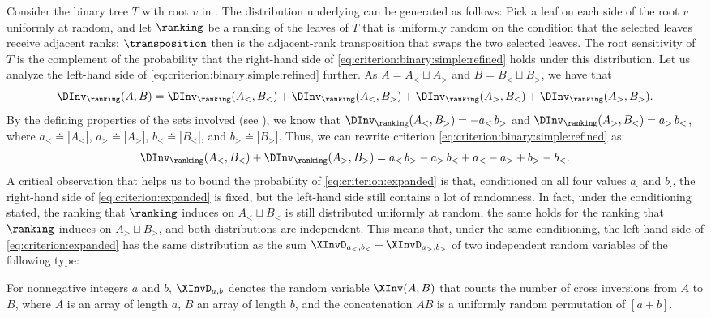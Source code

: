Consider the binary tree $T$ with root $v$ in . The distribution underlying  can be generated as follows: Pick a leaf on each side of the root $v$ uniformly at random, and let $\ranking$ be a ranking of the leaves of $T$ that is uniformly random on the condition that the selected leaves receive adjacent ranks; $\transposition$ then is the adjacent-rank transposition that swaps the two selected leaves. The root sensitivity of $T$ is the complement of the probability that the right-hand side of \eqref{eq:criterion:binary:simple:refined} holds under this distribution. Let us analyze the left-hand side of \eqref{eq:criterion:binary:simple:refined} further. As $A = A_< \sqcup A_>$ and $B = B_< \sqcup B_>$, we have that
\[ \DInv_\ranking(A,B) = \DInv_\ranking(A_<,B_<) + \DInv_\ranking(A_<,B_>) + \DInv_\ranking(A_>,B_<) + \DInv_\ranking(A_>,B_>). \]
By the defining properties of the sets involved (see ), we know that $\DInv_\ranking(A_<,B_>) = - a_< \, b_>$ and $\DInv_\ranking(A_>,B_<) = a_> \, b_<$, where $a_< \doteq |A_<|$, $a_> \doteq |A_>|$, $b_< \doteq |B_<|$, and $b_> \doteq |B_>|$. Thus, we can rewrite criterion \eqref{eq:criterion:binary:simple:refined} as:
\begin{equation}\label{eq:criterion:expanded}
\DInv_\ranking(A_<,B_<) + \DInv_\ranking(A_>,B_>) = a_< \, b_> - a_> \, b_< + a_< - a_> + b_> - b_<.
\end{equation}
A critical observation that helps us to bound the probability of \eqref{eq:criterion:expanded} is that, conditioned on all four values $a_{\cdot}$ and $b_{\cdot}$, the right-hand side of \eqref{eq:criterion:expanded} is fixed, but the left-hand side still contains a lot of randomness. In fact, under the conditioning stated, the ranking that $\ranking$ induces on $A_< \sqcup B_<$ is still distributed uniformly at random, the same holds for the ranking that $\ranking$ induces on $A_> \sqcup B_>$, and both distributions are independent. This means that, under the same conditioning, the left-hand side of \eqref{eq:criterion:expanded} has the same distribution as the sum $\XInvD_{a_<,b_<} + \XInvD_{a_>,b_>}$ of two independent random variables of the following type:
\begin{definition}
For nonnegative integers $a$ and $b$, $\XInvD_{a,b}$ denotes the random variable $\XInv(A,B)$ that counts the number of cross inversions from $A$ to $B$, where $A$ is an array of length $a$, $B$ an array of length $b$, and the concatenation $AB$ is a uniformly random permutation of $[a+b]$.
\end{definition}
